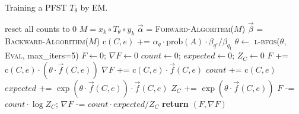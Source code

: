 \documentclass[11pt,letterpaper]{article}
\newcommand{\defeq}{\stackrel{\mbox{\tiny def}}{=}}
\begin{document}
\begin{algorithm}\begin{algorithmic}[1]
    \caption{Training a PFST $T_\theta$ by EM.}\label{alg:training}
    \small
      \State reset all counts to 0 
        
        \State $M = x_k \circ T_\theta \circ y_k$  
        \State $\vec{\alpha}$ = \textsc{Forward-Algorithm}($M$) 
        \State $\vec{\beta}$ = \textsc{Backward-Algorithm}($M$)
            \State $\text{c}(C,e)$ += $\alpha_q \cdot \text{prob}(A) \cdot \beta_{q'} / \beta_{q_{\textrm{I}}}$
          \EndIf
        \EndFor
      \EndFor
      \State $\theta \gets$ \textsc{l-bfgs}($\theta$, \textsc{Eval}, max\_iters=5) 
    \EndWhile
         \State $F \gets 0$; $\nabla F \gets 0$ 
           \State $\textit{count} \gets 0$; $\textit{expected} \gets 0$; $Z_C \gets 0$
             \State $F$ += $\text{c}(C,e) \cdot (\theta \cdot \vec{f}(C,e))$
             \State $\nabla F$ += $\text{c}(C,e) \cdot \vec{f}(C,e)$
             \State $\textit{count}$ += $\text{c}(C,e)$
             \State $\textit{expected}$ += $\exp ( \theta \cdot \vec{f}(C,e) ) \cdot \vec{f}(C,e)$
             \State $Z_C$ += $\exp ( \theta \cdot \vec{f}(C,e) )$
           \EndFor
           \State $F$ -= $\textit{count} \cdot \log Z_C$; $\nabla F$ -= $\textit{count} \cdot \textit{expected} / Z_C$
        \EndFor
        \State \textbf{return} $(F, \nabla F)$
    \EndFunction
\end{algorithmic}\end{algorithm}
\end{document}
